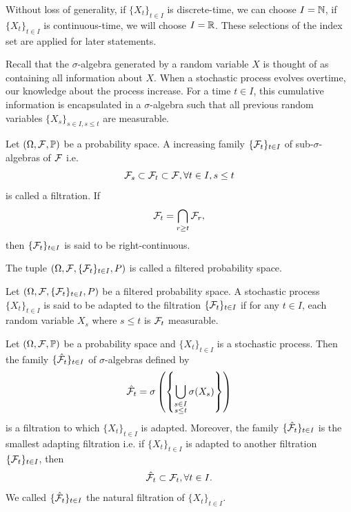 \begin{remark}
 Without loss of generality, if $\{X_t\}_{t\in I}$ is discrete-time, we can choose $I = \mathbb{N}$, if $\{X_t\}_{t\in I}$ is continuous-time, we will choose $I=\mathbb{R}$. These selections of the index set are applied for later statements.
\end{remark}

Recall that the $\sigma$-algebra generated by a random variable $X$ is thought of as containing all information about $X$. When a stochastic process evolves overtime, our knowledge about the process increase. For a time $t\in I$, this cumulative information is encapsulated in a $\sigma$-algebra such that all previous random variables $\{X_s\}_{s\in I, s\le t}$ are measurable.

\begin{definition}
 Let $(\Omega, \mathcal{F}, \mathbb{P})$ be a probability space. A increasing family $\{\mathcal{F}_t\}_{t\in I}$ of sub-$\sigma$-algebras of $\mathcal{F}$ i.e.
 $$\mathcal{F}_s\subset\mathcal{F}_t \subset \mathcal{F}, \forall t\in I, s\le t$$
 is called a filtration. If
 $$\mathcal{F}_t = \bigcap\limits_{r\ge t} \mathcal{F}_r,$$
 then $\{\mathcal{F}_t\}_{t\in I}$ is said to be right-continuous.

 The tuple $(\Omega, \mathcal{F}, \{\mathcal{F}_t\}_{t\in I}, P)$ is called a filtered probability space.
\end{definition}

\begin{definition}
 Let $(\Omega, \mathcal{F}, \{\mathcal{F}_t\}_{t\in I}, P)$ be a filtered probability space. A stochastic process $\{X_t\}_{t\in I}$ is said to be adapted to the filtration $\{\mathcal{F}_t\}_{t\in I}$ if for any $t\in I$, each random variable $X_s$ where $s\le t$ is $\mathcal{F}_t$ measurable.
\end{definition}

\begin{theorem}
 Let $(\Omega, \mathcal{F}, \mathbb{P})$ be a probability space and $\{X_t\}_{t\in I}$ is a stochastic process. Then the family $\{\hat{\mathcal{F}}_t\}_{t\in I}$ of $\sigma$-algebras defined by
 $$\hat{\mathcal{F}}_t = \sigma\left(\left\{\bigcup\limits_{\substack{s\in I \\ s\le t}} \sigma(X_s)\right\}\right)$$
 is a filtration to which $\{X_t\}_{t\in I}$ is adapted. Moreover, the family $\{\hat{\mathcal{F}}_t\}_{t\in I}$ is the smallest adapting filtration i.e. if $\{X_t\}_{t\in I}$ is adapted to another filtration $\{\mathcal{F}_t\}_{t\in I}$, then
 $$\hat{\mathcal{F}}_t \subset \mathcal{F}_t, \forall t\in I.$$
 We called $\{\hat{\mathcal{F}}_t\}_{t\in I}$ the natural filtration  of $\{X_t\}_{t\in I}$.
\end{theorem}

